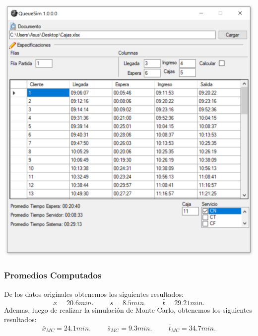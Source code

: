 \documentclass[10pt,letterpaper]{report}
\begin{document}
\begin{center}
\includegraphics[scale=0.5]{QueueSim_screenshot}
\end{center}
\subsubsection*{Promedios Computados}
De los datos originales obtenemos los siguientes resultados:
$$
\bar{x}=20.6 min. \hspace{1cm} \bar{s}=8.5 min. \hspace{1cm}  \bar{t}=29.21 min.
$$
Ademas, luego de realizar la simulación de Monte Carlo, obtenemos los siguientes resultados:
$$
\bar{x}_{MC}=24.1 min. \hspace{1cm} \bar{s}_{MC}=9.3 min. \hspace{1cm}  \bar{t}_{MC}=34.7 min.
$$
\end{document}
